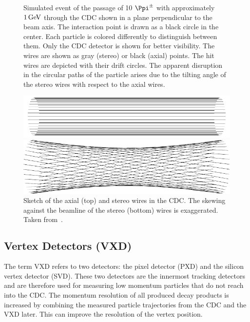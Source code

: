 \begin{figure}
\begin{tikzpicture}
  \end{tikzpicture}
  \caption[Simulated event of the passage of 10 $\Ppi^\pm$ through the CDC.]{Simulated event of the passage of 10 $\Ppi^\pm$ with approximately $\unit[1]{GeV}$ through the CDC shown in a plane perpendicular to the beam axis. The interaction point is drawn as a black circle in the center. Each particle is colored differently to distinguish between them. Only the CDC detector is shown for better visibility. The wires are shown as gray (stereo) or black (axial) points. The hit wires are depicted with their drift circles. The apparent disruption in the circular paths of the particle arises due to the tilting angle of the stereo wires with respect to the axial wires.}
  \label{fig-event-display}
\end{figure}

\begin{figure}
  \centering
  \includegraphics{figures/experimental_setup/axialLayers.pdf}
  
  \vspace*{1.5cm}
  
  \includegraphics{figures/experimental_setup/stereoLayers.pdf}
  \caption[Sketch of the axial (top) and stereo wires in the CDC.]{Sketch of the axial (top) and stereo wires in the CDC. The skewing against the beamline of the stereo (bottom) wires is exaggerated. Taken from~\cite{oliver}.}
  \label{fig-axial-stereo}
\end{figure}

\subsection{Vertex Detectors (VXD)}
The term VXD refers to two detectors: the pixel detector (PXD) and the silicon vertex detector (SVD). These two detectors are the innermost tracking detectors and are therefore used for measuring low momentum particles that do not reach into the CDC. The momentum resolution of all produced decay products is increased by combining the measured particle trajectories from the CDC and the VXD later. This can improve the resolution of the vertex position.

